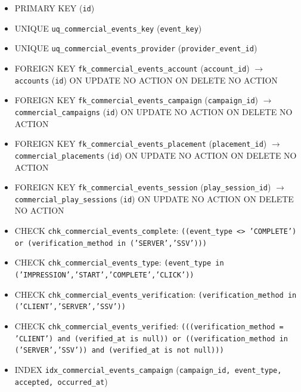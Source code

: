 \begin{itemize}

\item PRIMARY KEY (\texttt{id})

\item UNIQUE \texttt{uq\_commercial\_events\_key} (\texttt{event\_key})

\item UNIQUE \texttt{uq\_commercial\_events\_provider} (\texttt{provider\_event\_id})

\item FOREIGN KEY \texttt{fk\_commercial\_events\_account} (\texttt{account\_id}) $\rightarrow$ \texttt{accounts} (\texttt{id}) ON UPDATE NO ACTION ON DELETE NO ACTION

\item FOREIGN KEY \texttt{fk\_commercial\_events\_campaign} (\texttt{campaign\_id}) $\rightarrow$ \texttt{commercial\_campaigns} (\texttt{id}) ON UPDATE NO ACTION ON DELETE NO ACTION

\item FOREIGN KEY \texttt{fk\_commercial\_events\_placement} (\texttt{placement\_id}) $\rightarrow$ \texttt{commercial\_placements} (\texttt{id}) ON UPDATE NO ACTION ON DELETE NO ACTION

\item FOREIGN KEY \texttt{fk\_commercial\_events\_session} (\texttt{play\_session\_id}) $\rightarrow$ \texttt{commercial\_play\_sessions} (\texttt{id}) ON UPDATE NO ACTION ON DELETE NO ACTION

\item CHECK \texttt{chk\_commercial\_events\_complete}: \texttt{((event\_type <> 'COMPLETE') or (verification\_method in ('SERVER','SSV')))}

\item CHECK \texttt{chk\_commercial\_events\_type}: \texttt{(event\_type in ('IMPRESSION','START','COMPLETE','CLICK'))}

\item CHECK \texttt{chk\_commercial\_events\_verification}: \texttt{(verification\_method in ('CLIENT','SERVER','SSV'))}

\item CHECK \texttt{chk\_commercial\_events\_verified}: \texttt{(((verification\_method = 'CLIENT') and (verified\_at is null)) or ((verification\_method in ('SERVER','SSV')) and (verified\_at is not null)))}

\item INDEX \texttt{idx\_commercial\_events\_campaign} (\texttt{campaign\_id, event\_type, accepted, occurred\_at})

\end{itemize}

